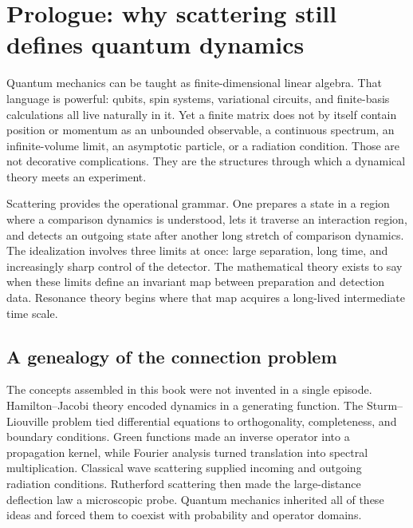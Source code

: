 \chapter*{Prologue: why scattering still defines quantum dynamics}
\label{chap:prologue-scattering}

Quantum mechanics can be taught as finite-dimensional linear algebra.  That
language is powerful: qubits, spin systems, variational circuits, and
finite-basis calculations all live naturally in it.  Yet a finite matrix does
not by itself contain position or momentum as an unbounded observable, a
continuous spectrum, an infinite-volume limit, an asymptotic particle, or a
radiation condition.  Those are not decorative complications.  They are the
structures through which a dynamical theory meets an experiment.

Scattering provides the operational grammar.  One prepares a state in a
region where a comparison dynamics is understood, lets it traverse an
interaction region, and detects an outgoing state after another long stretch
of comparison dynamics.  The idealization involves three limits at once:
large separation, long time, and increasingly sharp control of the detector.
The mathematical theory exists to say when these limits define an invariant
map between preparation and detection data.  Resonance theory begins where
that map acquires a long-lived intermediate time scale.

\section*{A genealogy of the connection problem}
{}

The concepts assembled in this book were not invented in a single episode.
Hamilton--Jacobi theory encoded dynamics in a generating function.  The
Sturm--Liouville problem tied differential equations to orthogonality,
completeness, and boundary conditions.  Green functions made an inverse
operator into a propagation kernel, while Fourier analysis turned translation
into spectral multiplication.  Classical wave scattering supplied incoming
and outgoing radiation conditions.  Rutherford scattering then made the
large-distance deflection law a microscopic probe.  Quantum mechanics
inherited all of these ideas and forced them to coexist with probability and
operator domains.


